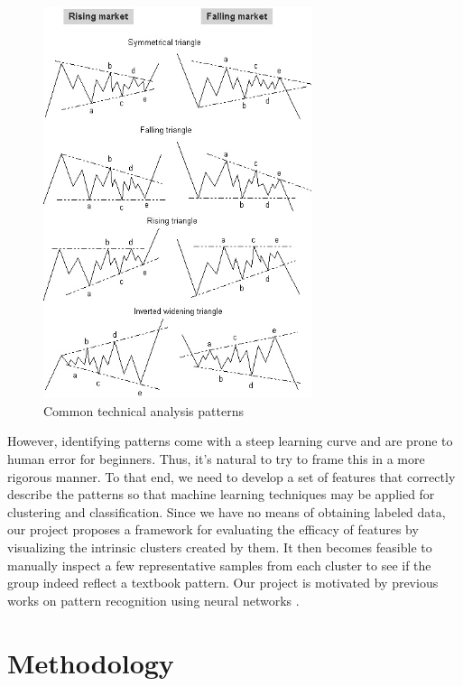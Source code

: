 \documentclass{article} %
\begin{document}
\begin{figure}[h]
\begin{center}
\includegraphics[width=0.7\textwidth]{chart_patterns.jpg}
\end{center}
\caption{Common technical analysis patterns \label{patterns}}
\end{figure}

However, identifying patterns come with a steep learning curve and are prone to human error for beginners. Thus, it's natural to try to frame this in a more rigorous manner. To that end, we need to develop a set of features that correctly describe the patterns so that machine learning techniques may be applied for clustering and classification. Since we have no means of obtaining labeled data, our project proposes a framework for evaluating the efficacy of features by visualizing the intrinsic clusters created by them. It then becomes feasible to manually inspect a few representative samples from each cluster to see if the group indeed reflect a textbook pattern. Our project is motivated by previous works on pattern recognition using neural networks \cite{Guo07recognizingstock}.


\section{Methodology}
\end{document}
